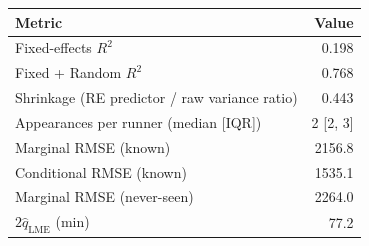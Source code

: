 \begin{tabular}{lr}
\hline
Metric & Value \\
\hline
Fixed-effects $R^2$ & 0.198 \\
Fixed + Random $R^2$ & 0.768 \\
Shrinkage (RE predictor / raw variance ratio) & 0.443 \\
Appearances per runner (median [IQR]) & 2 [2, 3] \\
Marginal RMSE (known) & 2156.8 \\
Conditional RMSE (known) & 1535.1 \\
Marginal RMSE (never-seen) & 2264.0 \\
$2\hat{q}_{\text{LME}}$ (min) & 77.2 \\
\hline
\end{tabular}
